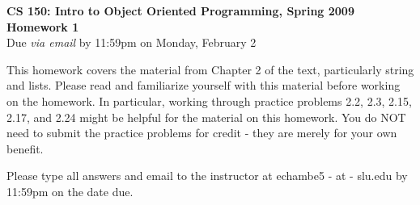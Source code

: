 \documentclass[11pt]{article}
\begin{document}

\begin{center}
\LARGE \textbf{CS 150: Intro to Object Oriented Programming, Spring
2009}
\\
\textbf{Homework 1}
\\[1ex]
\Large Due \emph{via email} by 11:59pm on Monday, February 2\\

\end{center}

This homework covers the material from Chapter 2 of the text,
particularly string and lists.  Please read and familiarize yourself
with this material before working on the homework.  In particular,
working through practice problems 2.2, 2.3, 2.15, 2.17, and 2.24
might be helpful for the material on this homework.  You do NOT need
to submit the practice problems for credit - they are merely for
your own benefit.

Please type all answers and email to the instructor at echambe5 - at - slu.edu by 11:59pm on the date due.
\end{document}
